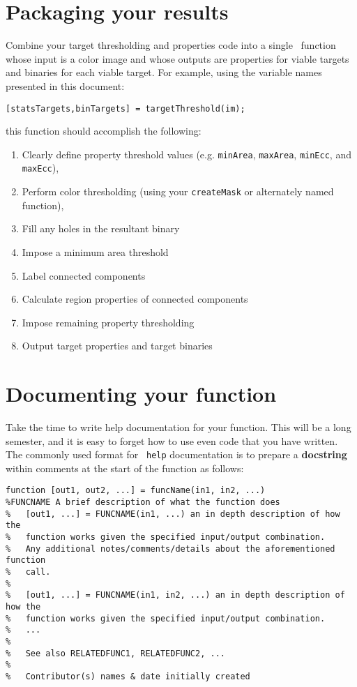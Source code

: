 \documentclass{tufte-handout}
\begin{document}
\section{Packaging your results}
Combine your target thresholding and properties code into a single \Matlab\ function whose input is a color image and whose outputs are properties for viable targets and binaries for each viable target. For example, using the variable names presented in this document:
\begin{lstlisting}[style=usnaMatlab]
[statsTargets,binTargets] = targetThreshold(im);
\end{lstlisting}
this function should accomplish the following:
\begin{enumerate}
\item Clearly define property threshold values (e.g. \lstinline{minArea}, \lstinline{maxArea}, \lstinline{minEcc}, and \lstinline{maxEcc}),
\item Perform color thresholding (using your \lstinline{createMask} or alternately named function),
\item Fill any holes in the resultant binary
\item Impose a minimum area threshold
\item Label connected components
\item Calculate region properties of connected components
\item Impose remaining property thresholding
\item Output target properties and target binaries
\end{enumerate}

\section{Documenting your function}
Take the time to write help documentation for your function. This will be a long semester, and it is easy to forget how to use even code that you have written. The commonly used format for \Matlab\ \lstinline{help} documentation is to prepare a \textbf{docstring} within comments at the start of the function as follows:
\begin{lstlisting}[style=usnaMatlab]
function [out1, out2, ...] = funcName(in1, in2, ...)
%FUNCNAME A brief description of what the function does
%	[out1, ...] = FUNCNAME(in1, ...) an in depth description of how the 
%	function works given the specified input/output combination.
%	Any additional notes/comments/details about the aforementioned function 
%	call.
%
%	[out1, ...] = FUNCNAME(in1, in2, ...) an in depth description of how the 
%	function works given the specified input/output combination.
%	...
%
% 	See also RELATEDFUNC1, RELATEDFUNC2, ...
%
%	Contributor(s) names & date initially created
\end{lstlisting}
\end{document}
